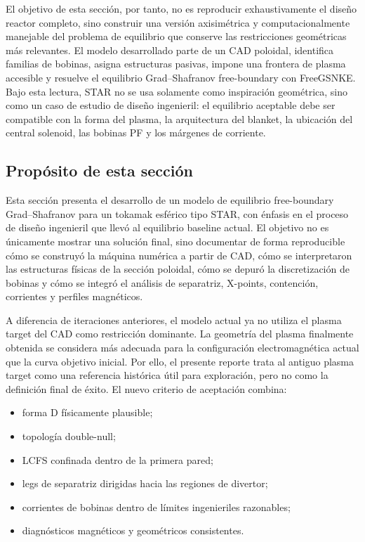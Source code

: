 \documentclass[11pt,a4paper]{article}
\begin{document}
El objetivo de esta sección, por tanto, no es reproducir exhaustivamente el diseño reactor completo,
sino construir una versión axisimétrica y computacionalmente manejable del problema de equilibrio
que conserve las restricciones geométricas más relevantes. El modelo desarrollado parte de un CAD
poloidal, identifica familias de bobinas, asigna estructuras pasivas, impone una frontera de plasma
accesible y resuelve el equilibrio Grad--Shafranov free-boundary con FreeGSNKE. Bajo esta lectura,
STAR no se usa solamente como inspiración geométrica, sino como un caso de estudio de diseño
ingenieril: el equilibrio aceptable debe ser compatible con la forma del plasma, la arquitectura del
blanket, la ubicación del central solenoid, las bobinas PF y los márgenes de corriente.

\subsection{Propósito de esta sección}
Esta sección presenta el desarrollo de un modelo de equilibrio free-boundary Grad--Shafranov
para un tokamak esférico tipo STAR, con énfasis en el proceso de diseño ingenieril que llevó
al equilibrio baseline actual. El objetivo no es únicamente mostrar una solución final, sino
documentar de forma reproducible cómo se construyó la máquina numérica a partir de CAD,
cómo se interpretaron las estructuras físicas de la sección poloidal, cómo se depuró la
discretización de bobinas y cómo se integró el análisis de separatriz, X-points, contención,
corrientes y perfiles magnéticos.

A diferencia de iteraciones anteriores, el modelo actual ya no utiliza el plasma target del CAD
como restricción dominante. La geometría del plasma finalmente obtenida se considera más
adecuada para la configuración electromagnética actual que la curva objetivo inicial. Por ello,
el presente reporte trata al antiguo plasma target como una referencia histórica útil para
exploración, pero no como la definición final de éxito. El nuevo criterio de aceptación combina:

\begin{itemize}
    \item forma D físicamente plausible;
    \item topología double-null;
    \item LCFS confinada dentro de la primera pared;
    \item legs de separatriz dirigidas hacia las regiones de divertor;
    \item corrientes de bobinas dentro de límites ingenieriles razonables;
    \item diagnósticos magnéticos y geométricos consistentes.
\end{itemize}
\end{document}
